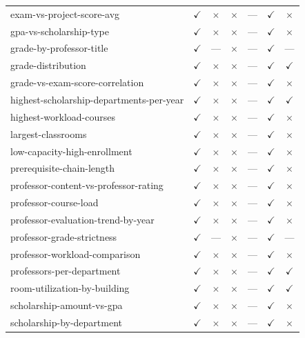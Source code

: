 \begin{longtable}{lcccccc}
exam-vs-project-score-avg & $\checkmark$ & $\times$ & $\times$ & --- & $\checkmark$ & $\times$ \\
gpa-vs-scholarship-type & $\checkmark$ & $\times$ & $\times$ & --- & $\checkmark$ & $\times$ \\
grade-by-professor-title & $\checkmark$ & --- & $\times$ & --- & $\checkmark$ & --- \\
grade-distribution & $\checkmark$ & $\times$ & $\times$ & --- & $\checkmark$ & $\checkmark$ \\
grade-vs-exam-score-correlation & $\checkmark$ & $\times$ & $\times$ & --- & $\checkmark$ & $\times$ \\
highest-scholarship-departments-per-year & $\checkmark$ & $\times$ & $\times$ & --- & $\checkmark$ & $\checkmark$ \\
highest-workload-courses & $\checkmark$ & $\times$ & $\times$ & --- & $\checkmark$ & $\times$ \\
largest-classrooms & $\checkmark$ & $\times$ & $\times$ & --- & $\checkmark$ & $\times$ \\
low-capacity-high-enrollment & $\checkmark$ & $\times$ & $\times$ & --- & $\checkmark$ & $\times$ \\
prerequisite-chain-length & $\checkmark$ & $\times$ & $\times$ & --- & $\checkmark$ & $\times$ \\
professor-content-vs-professor-rating & $\checkmark$ & $\times$ & $\times$ & --- & $\checkmark$ & $\times$ \\
professor-course-load & $\checkmark$ & $\times$ & $\times$ & --- & $\checkmark$ & $\times$ \\
professor-evaluation-trend-by-year & $\checkmark$ & $\times$ & $\times$ & --- & $\checkmark$ & $\times$ \\
professor-grade-strictness & $\checkmark$ & --- & $\times$ & --- & $\checkmark$ & --- \\
professor-workload-comparison & $\checkmark$ & $\times$ & $\times$ & --- & $\checkmark$ & $\times$ \\
professors-per-department & $\checkmark$ & $\times$ & $\times$ & --- & $\checkmark$ & $\checkmark$ \\
room-utilization-by-building & $\checkmark$ & $\times$ & $\times$ & --- & $\checkmark$ & $\checkmark$ \\
scholarship-amount-vs-gpa & $\checkmark$ & $\times$ & $\times$ & --- & $\checkmark$ & $\times$ \\
scholarship-by-department & $\checkmark$ & $\times$ & $\times$ & --- & $\checkmark$ & $\times$ \\

\end{longtable}
